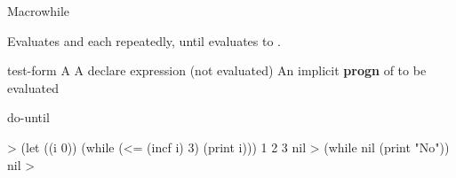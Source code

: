 \documentclass[10pt,twoside,english,pdftex]{article}
\begin{document}

\begin{functiondoc}{Macro}{while}{ 
    \superstar{}
    \superstar}
%
  
\fnsyntax

\fnpurpose Evaluates  and each 
repeatedly, until  evaluates to \nil.

\fnpackage {}

\fnmodule {}

\fnargs
\begin{args}{test-form}
 A 
\arg[declaration] A declare expression (not evaluated)
\arg[forms] An implicit \textbf{progn} of  to be evaluated
\end{args}

\begin{alsos}{do-until}
\also[do-until]
\also[until]
\end{alsos}

\fnexamples
%
\W\supp
\begin{example}
  > (let ((i 0)) 
      (while (<= (incf i) 3) 
         (print i)))
  1 
  2 
  3 
  nil\goodpagebreak
  > (while nil (print "No"))
  nil
  >
\end{example}

\end{functiondoc}

\end{document}
